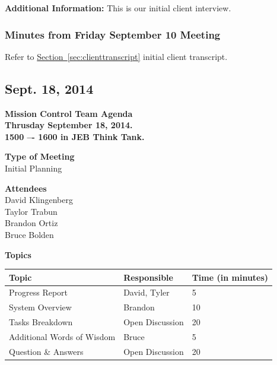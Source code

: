 \documentclass[pdftex,11pt]{article}
\begin{document}
\vspace*{2.5mm}
{ \large \bfseries \noindent Additional Information:}
This is our initial client interview.

\subsubsection[short]{Minutes from Friday September 10 Meeting}
Refer to \hyperref[sec:clienttranscript]{Section~\ref{sec:clienttranscript}} initial client  transcript.



\subsection{Sept. 18, 2014}
{ \huge \bfseries Mission Control Team Agenda \\[0.4cm] }
{ \huge \bfseries Thrusday September  18, 2014.\\1500 –-  1600  in JEB   Think  Tank. \\[0.4cm] }
\vspace*{2.5mm}

{ \large \bfseries \hspace*{2 mm} Type of Meeting\\}
\hspace*{12 mm} Initial Planning
\vspace*{1.5mm}

{ \large \bfseries \hspace*{2 mm} Attendees\\}
\hspace*{12mm} David Klingenberg\\
\hspace*{12mm} Taylor Trabun\\
\hspace*{12mm} Brandon Ortiz\\
\hspace*{12mm} Bruce Bolden\\
\vspace*{1.5mm}

{ \large \bfseries \noindent Topics}
\vspace*{2.5mm}

\begin{tabular}{| l | l | l |}
  \hline
  \bfseries Topic & \bfseries Responsible & \bfseries Time (in minutes) \\ \hline
  Progress Report  & David, Tyler &  5 \\ \hline
  System Overview & Brandon & 10 \\ \hline
  Tasks Breakdown & Open Discussion & 20 \\ \hline
  Additional Words of Wisdom & Bruce & 5 \\ \hline
  Question \&  Answers  & Open Discussion & 20 \\ 
  \hline
\end{tabular}
\end{document}
